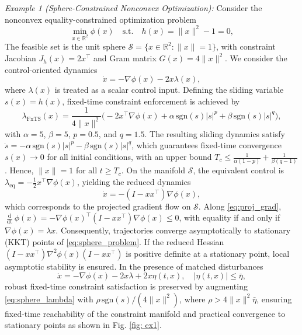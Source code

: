 \documentclass[letterpaper, 10 pt, conference]{ieeeconf}
\begin{document}
\textit{Example 1 (Sphere-Constrained Nonconvex Optimization):}
    Consider the nonconvex equality-constrained optimization problem
\begin{equation}
\label{eq:sphere_problem}
\min_{x\in\mathbb{R}^2} \phi(x)
\quad \text{s.t.} \quad
h(x)=\|x\|^2-1=0,
\end{equation}
The feasible set is the unit sphere $\mathcal{S}=\{x \in \mathbb{R}^2 :\|x\|=1\}$, with constraint Jacobian
$J_h(x)=2x^\top$ and Gram matrix $G(x)=4\|x\|^2$. We consider the control-oriented dynamics
\begin{equation}
\label{eq:sphere_dyn}
\dot{x}=-\nabla \phi(x)-2x\lambda(x),
\end{equation}
where $\lambda(x)$ is treated as a scalar control input. Defining the sliding
variable $s(x)=h(x)$, fixed-time constraint enforcement is achieved by
\begin{equation}
\label{eq:sphere_lambda}
\lambda_{\mathrm{FxTS}}(x)=\!\!\frac{1}{4\|x\|^2}\Big(\!\!-2x^\top\nabla \phi(x)+\alpha\,\mathrm{sgn}(s)|s|^p+\beta\,\mathrm{sgn}(s)|s|^q\!\Big),
\end{equation}
with $\alpha=5$, $\beta=5$, $p=0.5$, and $q=1.5$. The resulting sliding dynamics satisfy $\dot{s}=-\alpha\,\mathrm{sgn}(s)|s|^p-\beta\,\mathrm{sgn}(s)|s|^q$, which guarantees fixed-time convergence $s(x)\to 0$ for all initial conditions, with an upper bound $T_c \le \frac{1}{\alpha(1-p)}+\frac{1}{\beta(q-1)}$. Hence, $\|x\|=1$ for all $t\ge T_c$. On the manifold $\mathcal{S}$, the equivalent control is $\lambda_{\mathrm{eq}}=-\frac{1}{2}x^\top\nabla \phi(x)$, yielding the reduced dynamics
\begin{equation}
\label{eq:proj_grad}
\dot{x}=-(I-xx^\top)\nabla \phi(x),
\end{equation}
which corresponds to the projected gradient flow on $\mathcal{S}$. Along
\eqref{eq:proj_grad}, $\frac{\operatorname{d}}{\operatorname{dt}}\phi(x)=-\nabla \phi(x)^\top (I-xx^\top)\nabla \phi(x)\le 0$, with equality if and only if $\nabla \phi(x)=\lambda x$. Consequently, trajectories converge asymptotically to stationary (KKT) points of \eqref{eq:sphere_problem}. If the reduced Hessian
$(I-xx^\top)\nabla^2\phi(x)(I-xx^\top)$ is positive definite at a stationary point, local asymptotic stability is ensured. In the presence of matched disturbances
\begin{equation}
  \dot{x}=-\nabla \phi(x)-2x\lambda+2x\eta(t,x), \quad |\eta(t,x)|\le\bar{\eta},  
\end{equation}
robust fixed-time constraint satisfaction is preserved by augmenting
\eqref{eq:sphere_lambda} with $\rho\,\mathrm{sgn}(s)/(4\|x\|^2)$, where
$\rho>4\|x\|^2\bar{\eta}$, ensuring fixed-time reachability of the constraint
manifold and practical convergence to stationary points as shown in Fig. \ref{fig: ex1}.
\end{document}

